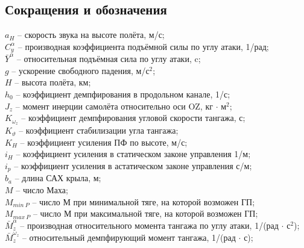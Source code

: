 \newpage
\begin{center}
     \section*{Сокращения и обозначения}
\end{center}
\newcommand{\Mza}{\bar{M}_z^\alpha}
\newcommand{\Mzwz}{\bar{M}_z^{\omega_z}}
\newcommand{\mza}{m_z^\alpha}
\newcommand{\mzwz}{m_z^{\omega_z}}
\newcommand{\mzf}{m_z^{\delta_{\text{э}}}}
\newcommand{\Cya}{C_y^\alpha}
\newcommand{\Mzf}{\bar{M}_z^{\delta_\text{э}}}
\newcommand{\mzwzch}{m_z^{\bar{\omega}_z}}
\newcommand{\ones}{\frac{1}{с}}
$a_H$ -- скорость звука на высоте полёта, м/с; \\
$\Cya$ -- производная коэффициента подъёмной силы по углу атаки, 1/рад; \\ 
$\bar{Y}^{\alpha}$ -- относительная подъёмная сила по углу атаки, c; \\
$g$ -- ускорение свободного падения, м/с$^2$; \\ 
$H$ -- высота полёта, км; \\ 
$h_0$ -- коэффициент демпфирования в продольном канале, 1/с;\\
$J_z$ -- момент инерции самолёта относительно оси OZ, кг $\cdot$ м$^2$; \\ 
$K_{\omega_z}$ -- коэффициент демпфирования угловой скорости тангажа, с;  \\
$K_{\vartheta}$ -- коэффициент стабилизации угла тангажа;\\
$K_H$ -- коэффициент усиления ПФ по высоте, м/с;\\
$i_H$ -- коэффициент усиления в статическом законе управления 1/м;\\
$i_p$ -- коэффициент усиления в астатическом законе управления с/м;\\
$b_a$ -- длина САХ крыла, м; \\ 
$M$ -- число Маха;\\
$M_{min \ P}$ -- число М при минимальной тяге, на которой возможен ГП; \\
$M_{max \ P}$ -- число М при максимальной тяге, на которой возможен ГП;\\
$\Mza$ -- производная относительного момента тангажа по углу атаки, 1/(рад $\cdot$ с$^2$);\\
$\Mzwz$ -- относительный демпфирующий момент тангажа, 1/(рад $\cdot$ с);\\
